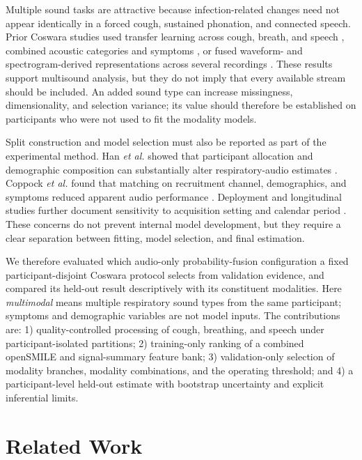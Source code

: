 \documentclass[conference]{IEEEtran}
\begin{document}
Multiple sound tasks are attractive because infection-related changes need not
appear identically in a forced cough, sustained phonation, and connected speech.
Prior Coswara studies used transfer learning across cough, breath, and speech
\cite{pahar2022transfer}, combined acoustic categories and symptoms
\cite{chetupalli2023multimodal}, or fused waveform- and spectrogram-derived
representations across several recordings \cite{truong2024fair}. These results
support multisound analysis, but they do not imply that every available stream
should be included. An added sound type can increase missingness, dimensionality,
and selection variance; its value should therefore be established on participants
who were not used to fit the modality models.

Split construction and model selection must also be reported as part of the
experimental method. Han \emph{et al.} showed that participant allocation and
demographic composition can substantially alter respiratory-audio estimates
\cite{han2022realistic}. Coppock \emph{et al.} found that matching on recruitment
channel, demographics, and symptoms reduced apparent audio performance
\cite{coppock2024audio}. Deployment and longitudinal studies further document
sensitivity to acquisition setting and calendar period
\cite{grant2022deployment,kim2024longitudinal,ganitidis2025drift}. These concerns
do not prevent internal model development, but they require a clear separation
between fitting, model selection, and final estimation.

We therefore evaluated which audio-only probability-fusion configuration a
fixed participant-disjoint Coswara protocol selects from validation evidence,
and compared its held-out result descriptively with its constituent modalities.
Here \emph{multimodal} means multiple respiratory sound types from the same
participant; symptoms and demographic variables are not model inputs. The
contributions are: 1) quality-controlled processing of cough, breathing, and
speech under participant-isolated partitions; 2) training-only ranking of a
combined openSMILE and signal-summary feature bank; 3) validation-only selection
of modality branches, modality combinations, and the operating threshold; and
4) a participant-level held-out estimate with bootstrap uncertainty and explicit
inferential limits.

\section{Related Work}
\end{document}
